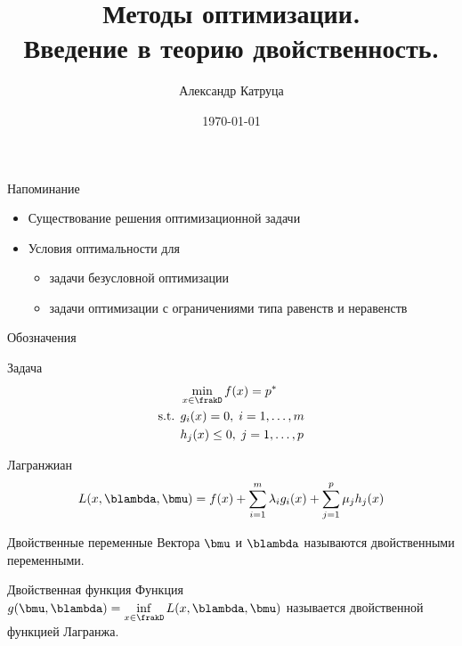 \documentclass[12pt]{beamer}
\title[Двойственность]{Методы оптимизации. \\
 Введение в теорию двойственность.}
\author{Александр Катруца}
\institute{Московский физико-технический институт}
\date{\today}
\begin{document}
\begin{frame}
\maketitle
\end{frame}

\begin{frame}{Напоминание}
\begin{itemize}
\item Существование решения оптимизационной задачи 
\item Условия оптимальности для
\begin{itemize}
\item задачи безусловной оптимизации
\item задачи оптимизации с ограничениями типа равенств и неравенств
\end{itemize}
\end{itemize}
\end{frame}

\begin{frame}{Обозначения}
\small
\begin{block}{Задача}
\vspace{-5mm}
\begin{equation*}
\begin{split}
& \min\limits_{x \in \frakD} f(x) = p^*\\
\text{s.t. } & g_i(x) = 0, \; i = 1,\ldots,m\\
& h_j(x) \leq 0, \; j = 1,\ldots, p
\end{split}
\end{equation*}
\end{block}

\begin{block}{Лагранжиан}
\vspace{-2mm}
\begin{equation*}
L(x, \blambda, \bmu) = f(x) + \sum\limits_{i=1}^m\lambda_i g_i(x) + \sum\limits_{j=1}^p \mu_j h_j(x)
\vspace{-2mm}
\end{equation*}
\end{block}

\begin{block}{Двойственные переменные}
Вектора $\bmu$ и $\blambda$ называются двойственными переменными.
\end{block}

\begin{block}{Двойственная функция}
Функция $g(\bmu, \blambda) = \inf\limits_{x \in \frakD} L(x, \blambda, \bmu)$ называется двойственной функцией Лагранжа.
\end{block}

\end{frame}
\end{document}
